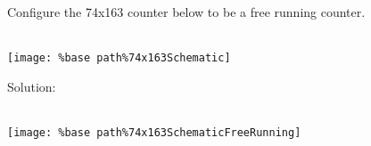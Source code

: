 Configure the 74x163 counter below to be a free running counter. \\ \\
\begin{center}
  \texttt{[image: \%base path\%74x163Schematic]}
\end{center}

Solution: \\ \\
\begin{center}
  \texttt{[image: \%base path\%74x163SchematicFreeRunning]}
\end{center}

